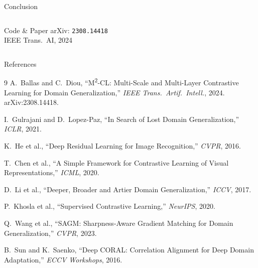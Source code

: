 \documentclass[aspectratio=169,10pt]{beamer}
\begin{document}
\begin{frame}{Conclusion}
\begin{columns}[T]
      \vspace{0.6em}
      \begin{block}{Code \& Paper}
        \small
        arXiv: \texttt{2308.14418}\\[4pt]
        IEEE Trans.\ AI, 2024
      \end{block}
  \end{columns}
\end{frame}

\begin{frame}[allowframebreaks]{References}
  \small
  \begin{thebibliography}{9}
      A.~Ballas and C.~Diou,
      ``M\textsuperscript{2}-CL: Multi-Scale and Multi-Layer Contrastive Learning for Domain Generalization,''
      \emph{IEEE Trans.\ Artif.\ Intell.}, 2024. arXiv:2308.14418.

      I.~Gulrajani and D.~Lopez-Paz,
      ``In Search of Lost Domain Generalization,''
      \emph{ICLR}, 2021.

      K.~He et al.,
      ``Deep Residual Learning for Image Recognition,''
      \emph{CVPR}, 2016.

      T.~Chen et al.,
      ``A Simple Framework for Contrastive Learning of Visual Representations,''
      \emph{ICML}, 2020.

      D.~Li et al.,
      ``Deeper, Broader and Artier Domain Generalization,''
      \emph{ICCV}, 2017.

      P.~Khosla et al.,
      ``Supervised Contrastive Learning,''
      \emph{NeurIPS}, 2020.

      Q.~Wang et al.,
      ``SAGM: Sharpness-Aware Gradient Matching for Domain Generalization,''
      \emph{CVPR}, 2023.

      B.~Sun and K.~Saenko,
      ``Deep CORAL: Correlation Alignment for Deep Domain Adaptation,''
      \emph{ECCV Workshops}, 2016.
  \end{thebibliography}
\end{frame}
\end{document}
